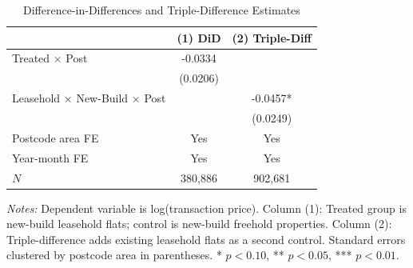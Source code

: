 \begin{table}[H]
\centering
\caption{Difference-in-Differences and Triple-Difference Estimates}
\label{tab:did}
\begin{threeparttable}
\begin{tabular}{lcc}
\toprule
 & (1) DiD & (2) Triple-Diff \\
\midrule
Treated $\times$ Post & -0.0334 & \\
 & (0.0206) & \\[0.5em]
Leasehold $\times$ New-Build $\times$ Post & & -0.0457* \\
 & & (0.0249) \\[0.5em]
Postcode area FE & Yes & Yes \\
Year-month FE & Yes & Yes \\
$N$ & 380,886 & 902,681 \\
\bottomrule
\end{tabular}
\begin{tablenotes}[flushleft]
\small
\item \textit{Notes:} Dependent variable is log(transaction price). Column (1): Treated group is new-build leasehold flats; control is new-build freehold properties. Column (2): Triple-difference adds existing leasehold flats as a second control. Standard errors clustered by postcode area in parentheses. * $p<0.10$, ** $p<0.05$, *** $p<0.01$.
\end{tablenotes}
\end{threeparttable}
\end{table}
